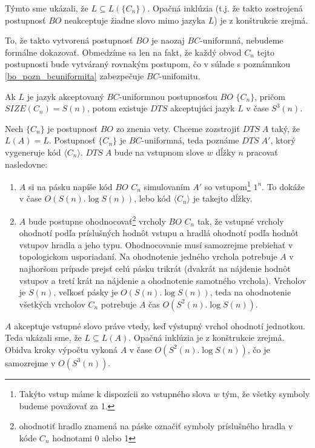 {\begin{dokaz}
  Týmto sme ukázali, že $L\subseteq L(\{ C_n\})$. Opačná inklúzia
  (t.j. že takto zostrojená postupnosť $BO$ neakceptuje žiadne slovo
  mimo jazyka $L$) je z konštrukcie zrejmá.

  To, že takto vytvorená postupnosť $BO$ je naozaj $BC$-uniformná,
  nebudeme formálne dokazovať. Obmedzíme sa len na fakt, že každý
  obvod $C_n$ tejto postupnosti bude vytváraný rovnakým postupom, čo
  v súlade s poznámnkou \ref{bo_pozn_bcuniformita} zabezpečuje
  $BC$-unifomitu.
\end{dokaz}

\begin{veta}
  \label{bo_veta_bosizetodtime}

  Ak $L$ je jazyk akceptovaný $BC$-uniformnou postupnosťou $BO$ $\{
  C_n\}$, pričom\linebreak $SIZE(C_n)=S(n)$, potom existuje $DTS$
  akceptujúci jazyk $L$ v čase $S^3(n)$.
\end{veta}

\begin{dokaz}
  Nech $\{ C_n\}$ je postupnosť $BO$ zo znenia vety. Chceme
  zozstrojiť $DTS\; A$ taký, že $L(A)=L$. Postupnosť $\{ C_n\}$ je
  $BC$-uniformná, teda poznáme $DTS\; A'$, ktorý vygeneruje kód
  $\langle C_n\rangle$. $DTS\; A$ bude na vstupnom slove $w$ dĺžky
  $n$ pracovať nasledovne:
  \begin{enumerate}
    \item $A$ si na pásku napíše kód $BO$ $C_n$ simulovaním $A'$
    so vstupom\footnote{Takýto vstup máme k dispozícii zo vstupného
    slova $w$ tým, že všetky symboly budeme považovať za 1.} $1^n$.
    To dokáže v čase $O(S(n).\log S(n))$, lebo kód
    $\langle C_n\rangle$ je takejto dĺžky.
    \item $A$ bude postupne ohodnocovať\footnote{ohodnotiť hradlo
    znamená na páske označiť symboly príslušného hradla v kóde $C_n$
    hodnotami 0 alebo 1}
    vrcholy $BO$ $C_n$ tak, že vstupné vrcholy ohodnotí podľa
    príslušných hodnôt vstupu a hradlá ohodnotí podľa hodnôt vstupov
    hradla a jeho typu. Ohodnocovanie musí samozrejme prebiehať v topologickom
    usporiadaní. Na ohodnotenie jedného vrchola potrebuje $A$ v
    najhoršom prípade prejsť celú pásku trikrát (dvakrát na nájdenie
    hodnôt vstupov a tretí krát na nájdenie a ohodnotenie samotného
    vrchola). Vrcholov je $S(n)$, veľkosť pásky je $O(S(n).\log S(n))$,
    teda na ohodnotenie všetkých vrcholov $C_n$ potrebuje $A$ čas
    $O(S^2(n).\log S(n))$.
  \end{enumerate}
  $A$ akceptuje vstupné slovo práve vtedy, keď výstupný vrchol
  ohodnotí jednotkou. Teda ukázali sme, že $L\subseteq L(A)$. Opačná
  inklúzia je z konštrukcie zrejmá. Obidva kroky výpočtu vykoná $A$
  v čase $O(S^2(n).\log S(n))$, čo je samozrejme v $O(S^3(n))$.
\end{dokaz}

}
